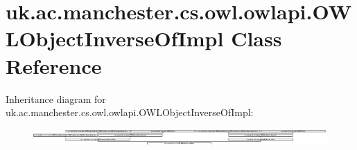 \hypertarget{classuk_1_1ac_1_1manchester_1_1cs_1_1owl_1_1owlapi_1_1_o_w_l_object_inverse_of_impl}{\section{uk.\-ac.\-manchester.\-cs.\-owl.\-owlapi.\-O\-W\-L\-Object\-Inverse\-Of\-Impl Class Reference}
\label{classuk_1_1ac_1_1manchester_1_1cs_1_1owl_1_1owlapi_1_1_o_w_l_object_inverse_of_impl}
}
Inheritance diagram for uk.\-ac.\-manchester.\-cs.\-owl.\-owlapi.\-O\-W\-L\-Object\-Inverse\-Of\-Impl\-:\begin{figure}[H]
\begin{center}
\leavevmode
\includegraphics[height=0.633663cm]{classuk_1_1ac_1_1manchester_1_1cs_1_1owl_1_1owlapi_1_1_o_w_l_object_inverse_of_impl}
\end{center}
\end{figure}

